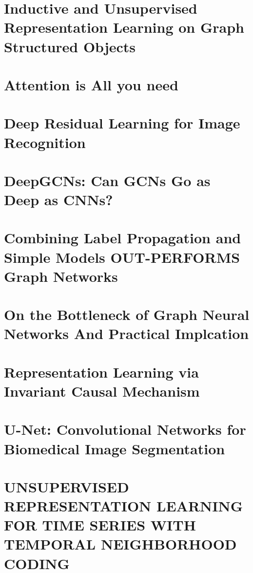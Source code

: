 \documentclass[a4paper,table]{article}
\begin{document}
\section{Inductive and Unsupervised Representation Learning on Graph Structured Objects}


\section{Attention is All you need}


\section{Deep Residual Learning for Image Recognition}


\section{DeepGCNs: Can GCNs Go as Deep as CNNs?}


\section{Combining Label Propagation and Simple Models OUT-PERFORMS Graph Networks}


\section{On the Bottleneck of Graph Neural Networks And Practical Implcation}


\section{Representation Learning via Invariant Causal Mechanism}


\section{U-Net: Convolutional Networks for Biomedical Image Segmentation}


\section{UNSUPERVISED REPRESENTATION LEARNING FOR TIME SERIES WITH TEMPORAL NEIGHBORHOOD CODING}

\end{document}
